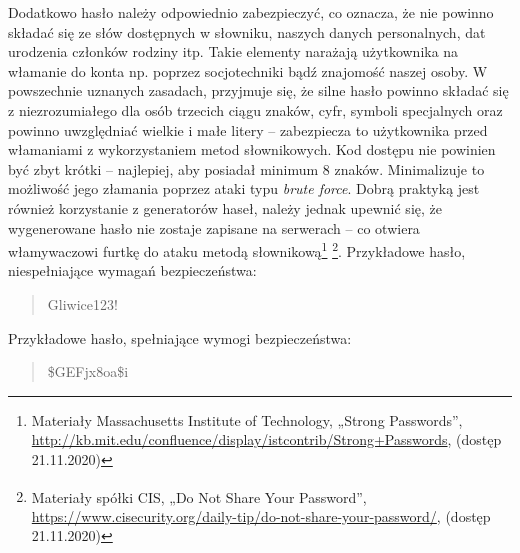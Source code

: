 \documentclass[twoside]{projektInzynierskiMS}
\numberwithin{figure}{section}
\begin{document}
Dodatkowo hasło należy odpowiednio zabezpieczyć, co oznacza, że nie powinno składać się ze słów dostępnych w słowniku, naszych danych personalnych, dat urodzenia członków rodziny itp. Takie elementy narażają użytkownika na włamanie do konta np. poprzez socjotechniki bądź znajomość naszej osoby. W powszechnie uznanych zasadach, przyjmuje się, że silne hasło powinno składać się z niezrozumiałego dla osób trzecich ciągu znaków, cyfr, symboli specjalnych oraz powinno uwzględniać wielkie i małe litery – zabezpiecza to użytkownika przed włamaniami z wykorzystaniem metod słownikowych. Kod dostępu nie powinien być zbyt krótki – najlepiej, aby posiadał minimum 8 znaków. Minimalizuje to możliwość jego złamania poprzez ataki typu \textit{brute force}. Dobrą praktyką jest również korzystanie z generatorów haseł, należy jednak upewnić się, że wygenerowane hasło nie zostaje zapisane na serwerach – co otwiera włamywaczowi furtkę do ataku metodą słownikową\footnote{Materiały Massachusetts Institute of Technology, „Strong Passwords”, \newline 
\url{http://kb.mit.edu/confluence/display/istcontrib/Strong+Passwords}, (dostęp 21.11.2020)}
\footnote{Materiały spółki CIS\textsuperscript{\textregistered}, „Do Not Share Your Password”, \newline 
\url{https://www.cisecurity.org/daily-tip/do-not-share-your-password/}, (dostęp 21.11.2020)}. \newline
Przykładowe hasło, niespełniające wymagań bezpieczeństwa:
\begin{center}
    \begin{quote}
        Gliwice123!
    \end{quote}
\end{center}
Przykładowe hasło, spełniające wymogi bezpieczeństwa:
\begin{center}
    \begin{quote}
        \$GEFjx8oa\$i\*
    \end{quote}
\end{center}
\end{document}
